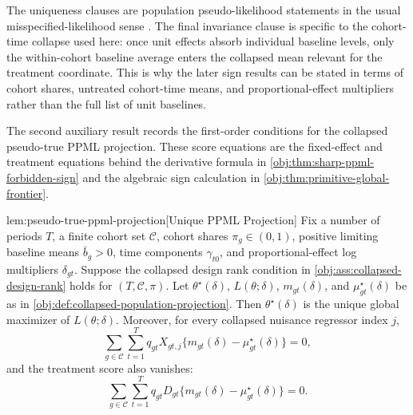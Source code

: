 \documentclass[11pt]{article}
\begin{document}
The uniqueness clauses are population pseudo-likelihood statements in the usual misspecified-likelihood sense \citep{White1982MisspecifiedML,GourierouxMonfortTrognon1984Theory,GourierouxMonfortTrognon1984Poisson}. The final invariance clause is specific to the cohort-time collapse used here: once unit effects absorb individual baseline levels, only the within-cohort baseline average enters the collapsed mean relevant for the treatment coordinate. This is why the later sign results can be stated in terms of cohort shares, untreated cohort-time means, and proportional-effect multipliers rather than the full list of unit baselines.

The second auxiliary result records the first-order conditions for the collapsed pseudo-true PPML projection. These score equations are the fixed-effect and treatment equations behind the derivative formula in \cref{obj:thm:sharp-ppml-forbidden-sign} and the algebraic sign calculation in \cref{obj:thm:primitive-global-frontier}.

\begin{lemmav}{lem:pseudo-true-ppml-projection}[Unique PPML Projection]
Fix a number of periods \(T\), a finite cohort set \(\mathcal C\), cohort shares \(\pi_g\in(0,1)\), positive limiting baseline means \(\bar b_g>0\), time components \(\gamma_{t0}\), and proportional-effect log multipliers \(\delta_{gt}\). Suppose the collapsed design rank condition in \cref{obj:ass:collapsed-design-rank} holds for \((T,\mathcal C,\pi)\). Let \(\theta^\star(\delta)\), \(L(\theta;\delta)\), \(m_{gt}(\delta)\), and \(\mu^\star_{gt}(\delta)\) be as in \cref{obj:def:collapsed-population-projection}. Then \(\theta^\star(\delta)\) is the unique global maximizer of \(L(\theta;\delta)\). Moreover, for every collapsed nuisance regressor index \(j\),
\[
\sum_{g\in\mathcal C}\sum_{t=1}^T
q_{gt} X_{gt,j}\{m_{gt}(\delta)-\mu^\star_{gt}(\delta)\}=0,
\]
and the treatment score also vanishes:
\[
\sum_{g\in\mathcal C}\sum_{t=1}^T
q_{gt} D_{gt}\{m_{gt}(\delta)-\mu^\star_{gt}(\delta)\}=0.
\]
\end{lemmav}
\end{document}
